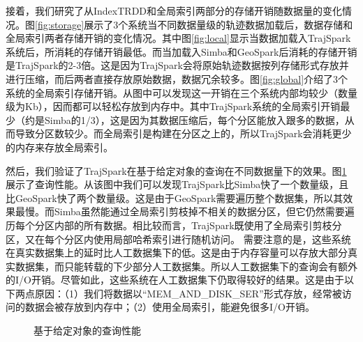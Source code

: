 接着，我们研究了从IndexTRDD和全局索引两部分的存储开销随数据量的变化情况。图\ref{fig:storage}展示了3个系统当不同数据量级的轨迹数据加载后，数据存储和全局索引两者存储开销的变化情况。其中图\ref{fig:local}显示当数据加载入TrajSpark系统后，所消耗的存储开销最低。而当加载入Simba和GeoSpark后消耗的存储开销是TrajSpark的2-3倍。这是因为TrajSpark会将原始轨迹数据按列存储形式存放并进行压缩，而后两者直接存放原始数据，数据冗余较多。图\ref{fig:global}介绍了3个系统的全局索引存储开销。从图中可以发现这一开销在三个系统内部均较少（数量级为Kb），因而都可以轻松存放到内存中。其中TrajSpark系统的全局索引开销最少（约是Simba的1/3），这是因为其数据压缩后，每个分区能放入跟多的数据，从而导致分区数较少。而全局索引是构建在分区之上的，所以TrajSpark会消耗更少的内存来存放全局索引。



然后，我们验证了TrajSpark在基于给定对象的查询在不同数据量下的效果。图\ref{fig:ID-based} 展示了查询性能。从该图中我们可以发现TrajSpark比Simba快了一个数量级，且比GeoSpark快了两个数量级。这是由于GeoSpark需要遍历整个数据集，所以其效果最慢。而Simba虽然能通过全局索引剪枝掉不相关的数据分区，但它仍然需要遍历每个分区内部的所有数据。相比较而言，TrajSpark既使用了全局索引剪枝分区，又在每个分区内使用局部哈希索引进行随机访问。
需要注意的是，这些系统在真实数据集上的延时比人工数据集下的低。这是由于内存容量可以存放大部分真实数据集，而只能转载的下少部分人工数据集。所以人工数据集下的查询会有额外的I/O开销。尽管如此，这些系统在人工数据集下仍取得较好的结果。这是由于以下两点原因：（1）我们将数据以``MEM\_AND\_DISK\_SER''形式存放，经常被访问的数据会被存放到内存中；（2）使用全局索引，能避免很多I/O开销。
\begin{figure}[t]
	\centering
	\caption{基于给定对象的查询性能}
	\label{fig:ID-based}
\end{figure}

